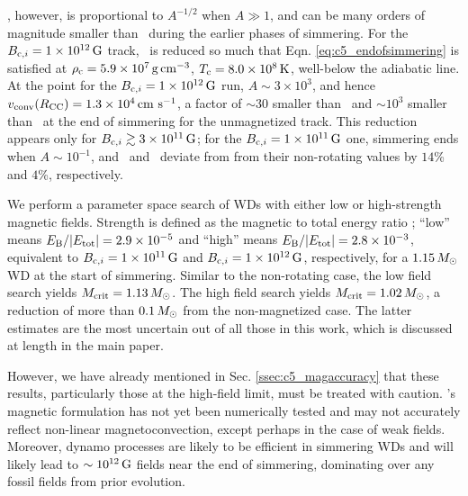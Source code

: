 \vconv, however, is proportional to $A^{-1/2}$ when $A \gg 1$, and can be many orders of magnitude smaller than \vconvzero\ during the earlier phases of simmering.  For the $\Binit = 1\times10^{12}\,\mrm{G}$ track, \vconv\ is reduced so much that Eqn. \ref{eq:c5_endofsimmering} is satisfied at $\rhoc = 5.9\times10^7\,\gcc$, $\Tc = 8.0\times10^8\,\mrm{K}$, well-below the adiabatic \citeal{wooswk04} line.  At the \citeal{wooswk04} point for the $\Binit = 1\times10^{12}\,\mrm{G}$ run, $A \sim 3\times10^3$, and hence $\vconvrcc = 1.3\times10^{4}\,\cmpsec$, a factor of $\sim30$ smaller than \vconvzero\ and $\sim10^3$ smaller than \vconvrcc\ at the end of simmering for the unmagnetized track.  This reduction appears only for $\Binit \gtrsim 3\times10^{11}\,\mrm{G}$; for the $\Binit = 1\times10^{11}\,\mrm{G}$ one, simmering ends when $A \sim 10^{-1}$, and \rhoc\ and \Tc\ deviate from from their non-rotating values by $14$\% and $4$\%, respectively.


We perform a parameter space search of WDs with either low or high-strength magnetic fields.  Strength is defined as the magnetic to total energy ratio \EBEtot; ``low'' means $\EBEtot = 2.9\times10^{-5}$ and ``high'' means $\EBEtot = 2.8\times10^{-3}$, equivalent to $\Binit = 1\times10^{11}\,\mrm{G}$ and $\Binit = 1\times10^{12}\,\mrm{G}$, respectively, for a $1.15\,\Msun$ WD at the start of simmering.  Similar to the non-rotating case, the low field search yields $\Mcrit = 1.13\,\Msun$.  The high field search yields $\Mcrit = 1.02\,\Msun$, a reduction of more than $0.1\,\Msun$ from the non-magnetized case.  The latter estimates are the most uncertain out of all those in this work, which is discussed at length in the main paper.  




However, we have already mentioned in Sec. \ref{ssec:c5_magaccuracy} that these results, particularly those at the high-field limit, must be treated with caution.  \citeal{stev79}'s magnetic formulation has not yet been numerically tested and may not accurately reflect non-linear magnetoconvection, except perhaps in the case of weak fields.  Moreover, dynamo processes are likely to be efficient in simmering WDs and will likely lead to $\sim10^{12}\,\mathrm{G}$ fields near the end of simmering, dominating over any fossil fields from prior evolution.

